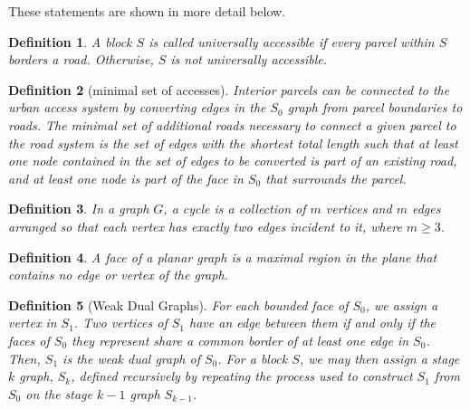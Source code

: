 \documentclass[10pt]{article}
\newtheorem{definition}{Definition}
\begin{document}
These statements are shown in more detail below.

\begin{definition}
A block $S$ is called universally accessible if every parcel within $S$ borders a road.  Otherwise, $S$ is not universally accessible.
\end{definition}

\begin{definition}[minimal set of accesses]
Interior parcels can be connected to the urban access system by converting edges in the $S_0$ graph from parcel boundaries to roads.  The minimal set of additional roads necessary to connect a given parcel to the road system is the set of edges with the shortest total length such that at least one node contained in the set of edges to be converted is part of an existing road, and at least one node is part of the face in $S_0$ that surrounds the parcel.
\end{definition}

\begin{definition}
In a graph $G$, a cycle is a collection of $m$ vertices and $m$ edges arranged so that each vertex has exactly two edges incident to it, where $m \ge 3$.
\end{definition}

\begin{definition}
A face of a planar graph is a maximal region in the plane that contains no edge or vertex of the graph.
\end{definition}

\begin{definition}[Weak Dual Graphs]
For each bounded face of $S_0$, we assign a vertex in $S_1$. Two vertices of $S_1$ have an edge between them if and only if the faces of $S_0$ they represent share a common border of at least one edge in $S_0$. Then, $S_1$ is the weak dual graph of $S_0$. For a block $S$, we may then assign a stage $k$ graph, $S_k$, defined recursively by repeating the process used to construct $S_1$ from $S_0$ on the stage $k-1$ graph $S_{k-1}$.
\end{definition}
\end{document}
